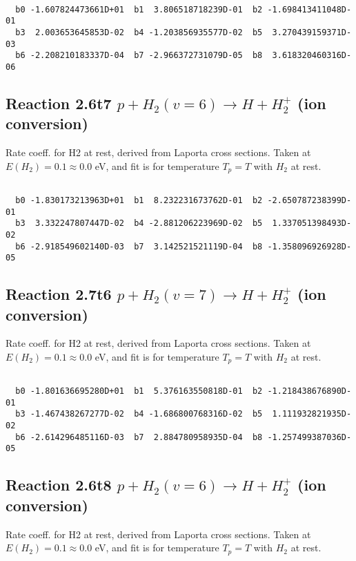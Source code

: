 \begin{small}\begin{verbatim}

  b0 -1.607824473661D+01  b1  3.806518718239D-01  b2 -1.698413411048D-01
  b3  2.003653645853D-02  b4 -1.203856935577D-02  b5  3.270439159371D-03
  b6 -2.208210183337D-04  b7 -2.966372731079D-05  b8  3.618320460316D-06

\end{verbatim}\end{small}

\newpage
\subsection{
Reaction 2.6t7
$ p + H_2(v=6) \rightarrow H + H_2^+$ (ion conversion)
}
Rate coeff. for H2 at rest, derived from Laporta cross sections.
Taken at $E(H_2) = 0.1 \approx 0.0$ eV,  and fit is for temperature $T_p=T$ with $H_2$ at rest.

\begin{small}\begin{verbatim}

  b0 -1.830173213963D+01  b1  8.232231673762D-01  b2 -2.650787238399D-01
  b3  3.332247807447D-02  b4 -2.881206223969D-02  b5  1.337051398493D-02
  b6 -2.918549602140D-03  b7  3.142521521119D-04  b8 -1.358096926928D-05

\end{verbatim}\end{small}

\newpage
\subsection{
Reaction 2.7t6
$ p + H_2(v=7) \rightarrow H + H_2^+$ (ion conversion)
}
Rate coeff. for H2 at rest, derived from Laporta cross sections.
Taken at $E(H_2) = 0.1 \approx 0.0$ eV,  and fit is for temperature $T_p=T$ with $H_2$ at rest.

\begin{small}\begin{verbatim}

  b0 -1.801636695280D+01  b1  5.376163550818D-01  b2 -1.218438676890D-01
  b3 -1.467438267277D-02  b4 -1.686800768316D-02  b5  1.111932821935D-02
  b6 -2.614296485116D-03  b7  2.884780958935D-04  b8 -1.257499387036D-05

\end{verbatim}\end{small}

\newpage
\subsection{
Reaction 2.6t8
$ p + H_2(v=6) \rightarrow H + H_2^+$ (ion conversion)
}
Rate coeff. for H2 at rest, derived from Laporta cross sections.
Taken at $E(H_2) = 0.1 \approx 0.0$ eV,  and fit is for temperature $T_p=T$ with $H_2$ at rest.

